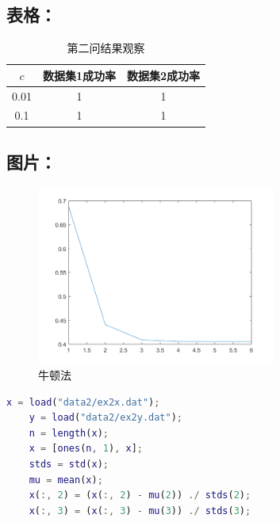 \documentclass{sdureport}
\begin{document}
\begin{sduDocument}
	\subsection{表格：}
	\begin{table}[H]
		\caption{第二问结果观察}
		\centering
		\linespread{1.5}
		\begin{tabular}{ccc}
			\toprule
			$c$  & 数据集1成功率 & 数据集2成功率 \\
			\midrule
			0.01 & 1             & 1             \\
			0.1  & 1             & 1             \\
			\bottomrule
		\end{tabular}
	\end{table}

	\subsection{图片：}
	\begin{figure}[H]
		\centering
		\includegraphics[width=0.7\textwidth]{figures/L2.png}
		\caption{牛顿法}
	\end{figure}


\end{sduDocument}

\sduAppendix %
\begin{lstlisting}[language=matlab]
	x = load("data2/ex2x.dat");
	y = load("data2/ex2y.dat");
	n = length(x);
	x = [ones(n, 1), x];
	stds = std(x);
	mu = mean(x);
	x(:, 2) = (x(:, 2) - mu(2)) ./ stds(2);
	x(:, 3) = (x(:, 3) - mu(3)) ./ stds(3);
\end{lstlisting}
\end{document}
